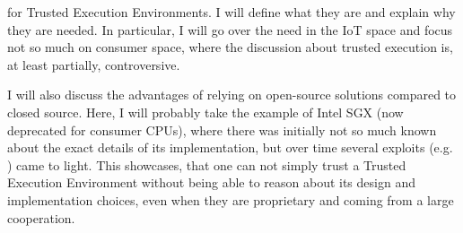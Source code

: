  for Trusted Execution Environments. I will define what they are and explain why they are needed. In particular, I will go over the need in the IoT space and focus not so much on consumer space, where the discussion about trusted execution is, at least partially, controversive.


I will also discuss the advantages of relying on open-source solutions compared to closed source. Here, I will probably take the example of Intel SGX (now deprecated for consumer CPUs), where there was initially not so much known about the exact details of its implementation, but over time several exploits (e.g. \cite{sgxspectre} \cite{plundervolt}) came to light. This showcases, that one can not simply trust a Trusted Execution Environment without being able to reason about its design and implementation choices, even when they are proprietary and coming from a large cooperation. 